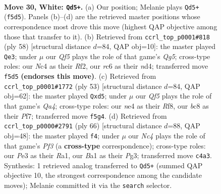 \documentclass[11pt]{article}
\begin{document}
\clearpage

\begin{figure}[p]\centering
\begin{subfigure}{0.46\textwidth}\centering
\resizebox{\linewidth}{!}{%
\newchessgame
\chessboard[
  setfen={r1b3k1/1p2q2p/2r5/1R3Qp1/p1N1n3/4P1P1/P4PKP/B3R3 w - - 1 30},
  showmover=false,
  pgfstyle=straightmove, color=movearrow, markmove={f5-d5}
]}
\caption{}
\end{subfigure}\hfill
\begin{subfigure}{0.46\textwidth}\centering
\resizebox{\linewidth}{!}{%
\newchessgame
\chessboard[
  setfen={4r1k1/r3ppb1/p5q1/1pNN2Qp/3nP2P/1P6/P4RP1/3R2K1 w - - 3 30},
  showmover=false,
  pgfstyle=straightmove, color=movearrow, markmove={g5-e3}
]}
\caption{}
\end{subfigure}
\\[4pt]
\begin{subfigure}{0.46\textwidth}\centering
\resizebox{\linewidth}{!}{%
\newchessgame
\chessboard[
  setfen={5rk1/1p3p2/p3Nb1p/q2R2p1/6P1/n1P4P/1P2QP2/K1B4R b - - 0 27},
  showmover=false,
  pgfstyle=straightmove, color=movearrow, markmove={a5-d5}
]}
\caption{}
\end{subfigure}\hfill
\begin{subfigure}{0.46\textwidth}\centering
\resizebox{\linewidth}{!}{%
\newchessgame
\chessboard[
  setfen={q2r1b1k/6p1/pR1nQ2p/Pp6/4p3/1P3PP1/4P1KP/R7 w - - 0 34},
  showmover=false,
  pgfstyle=straightmove, color=movearrow, markmove={f3-f4}
]}
\caption{}
\end{subfigure}
\caption{\textbf{Move 30, White: \texttt{Qd5+}.} (a) Our position; Melanie plays \texttt{Qd5+} (\texttt{f5d5}). Panels (b)--(d) are the retrieved master positions whose correspondence most drove this move (highest QAP objective among those that transfer to it). (b) Retrieved from \texttt{ccrl\_top\_p0001\#818} (ply 58) [structural distance $d$=84, QAP obj=10]: the master played \texttt{Qe3}; under $\mu$ our \emph{Qf5} plays the role of that game's \emph{Qg5}; cross-type roles: our \emph{N}c4 as their \emph{R}f2, our \emph{r}c6 as their \emph{n}d4; transferred move \texttt{f5d5} \textbf{(endorses this move)}. (c) Retrieved from \texttt{ccrl\_top\_p0001\#1772} (ply 53) [structural distance $d$=84, QAP obj=62]: the master played \texttt{Qxd5}; under $\mu$ our \emph{Qf5} plays the role of that game's \emph{Qa4}; cross-type roles: our \emph{n}e4 as their \emph{R}f8, our \emph{b}c8 as their \emph{P}f7; transferred move \texttt{f5g4}. (d) Retrieved from \texttt{ccrl\_top\_p0000\#2791} (ply 66) [structural distance $d$=88, QAP obj=48]: the master played \texttt{f4}; under $\mu$ our \emph{Nc4} plays the role of that game's \emph{Pf3} (a \textbf{cross-type} correspondence); cross-type roles: our \emph{P}e3 as their \emph{R}a1, our \emph{B}a1 as their \emph{P}g3; transferred move \texttt{c4a3}. Synthesis: 1 retrieved analog transferred to \texttt{Qd5+} (summed QAP objective 10, the strongest correspondence among the candidate moves); Melanie committed it via the \texttt{search} selector.}
\label{fig:thought-m58}
\end{figure}
\end{document}
